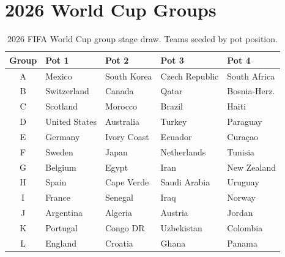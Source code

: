 \documentclass[11pt,a4paper]{article}
\begin{document}
\section{2026 World Cup Groups}
\label{sec:groups}

\begin{table}[h]
\centering
\caption{2026 FIFA World Cup group stage draw. Teams seeded by pot position.}
\label{tab:groups}
\begin{tabular}{cllll}
\toprule
\textbf{Group} & \textbf{Pot 1} & \textbf{Pot 2} & \textbf{Pot 3} & \textbf{Pot 4} \\
\midrule
A & Mexico          & South Korea      & Czech Republic & South Africa \\
B & Switzerland     & Canada           & Qatar          & Bosnia-Herz. \\
C & Scotland        & Morocco          & Brazil         & Haiti \\
D & United States   & Australia        & Turkey         & Paraguay \\
E & Germany         & Ivory Coast      & Ecuador        & Cura\c{c}ao \\
F & Sweden          & Japan            & Netherlands    & Tunisia \\
G & Belgium         & Egypt            & Iran           & New Zealand \\
H & Spain           & Cape Verde       & Saudi Arabia   & Uruguay \\
I & France          & Senegal         & Iraq           & Norway \\
J & Argentina       & Algeria          & Austria        & Jordan \\
K & Portugal        & Congo DR         & Uzbekistan     & Colombia \\
L & England         & Croatia          & Ghana          & Panama \\
\bottomrule
\end{tabular}
\end{table}
\end{document}
